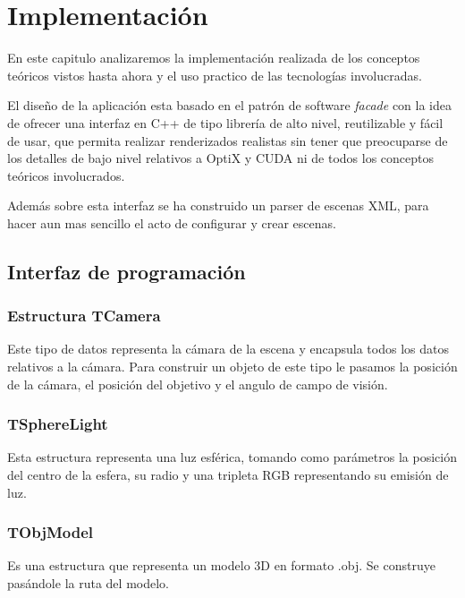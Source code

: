 \chapter{Implementación}

En este capitulo analizaremos la implementación realizada de los conceptos teóricos vistos hasta ahora y el uso practico de las tecnologías involucradas.

\medskip

El diseño de la aplicación esta basado en el patrón de software \emph{facade} con la idea de ofrecer una interfaz en C++ de tipo librería de alto nivel, reutilizable y fácil de usar, que permita realizar renderizados realistas sin tener que preocuparse de los detalles de bajo nivel relativos a OptiX y CUDA ni de todos los conceptos teóricos involucrados.

\medskip

Además sobre esta interfaz se ha construido un parser de escenas XML, para hacer aun mas sencillo el acto de configurar y crear escenas.

\clearpage

\section{Interfaz de programación}

\subsection{Estructura TCamera}

Este tipo de datos representa la cámara de la escena y encapsula todos los datos relativos a la cámara. Para construir un objeto de este tipo le pasamos la posición de la cámara, el posición del objetivo y el angulo de campo de visión.

\subsection{TSphereLight}

Esta estructura representa una luz esférica, tomando como parámetros la posición del centro de la esfera, su radio y una tripleta RGB representando su emisión de luz.

\subsection{TObjModel}

Es una estructura que representa un modelo 3D en formato .obj. Se construye pasándole la ruta del modelo. 

